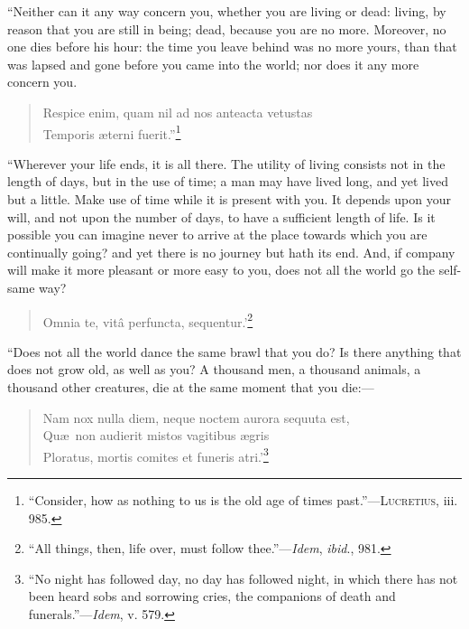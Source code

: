 \noindent ``Neither can it any way concern you, whether you are living
or dead: living, by reason that you are still in being; dead, because
you are no more. Moreover, no one dies before his hour: the time you
leave behind was no more yours, than that was lapsed and gone before
you came into the world; nor does it any more concern you.

\begin{verse}
Respice enim, quam nil ad nos anteacta vetustas\\
Temporis \ae terni fuerit.''\footnote{``Consider, how as nothing to us
is the old age of times past.''---\textsc{Lucretius}, iii. 985.}
\end{verse}

``Wherever your life ends, it is all there. The utility of living
consists not in the length of days, but in the use of time; a man may
have lived long, and yet lived but a little. Make use of time while it
is present with you. It depends upon your will, and not upon the
number of days, to have a sufficient length of life. Is it possible
you can imagine never to arrive at the place towards which you are
continually going? and yet there is no journey but hath its end.
And, if company will make it more pleasant or more easy to you, does
not all the world go the self-same way?

\begin{verse}
Omnia te, vit\^a perfuncta, sequentur.'\footnote{``All
things, then, life over, must follow thee.''---\textit{Idem},
\textit{ibid}., 981.}
\end{verse}

\noindent ``Does not all the world dance the same brawl that you do?
Is there anything that does not grow old, as well as you? A thousand
men, a thousand animals, a thousand other creatures, die at the same
moment that you die:---

\begin{verse}
Nam nox nulla diem, neque noctem aurora sequuta est,\\
Qu\ae\ non audierit mistos vagitibus \ae gris\\ Ploratus, mortis
comites et funeris atri.'\footnote{``No night has followed day, no day
has followed night, in which there has not been heard sobs and
sorrowing cries, the companions of death and
funerals.''---\textit{Idem}, v. 579.}
\end{verse}


